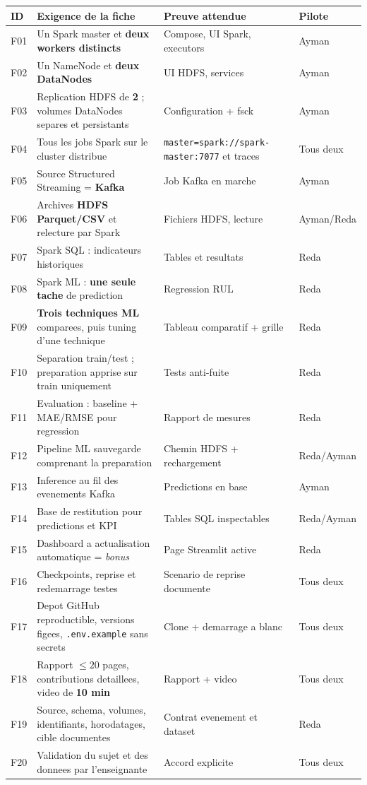 \documentclass[10pt,a4paper]{article}
\newcommand{\code}[1]{{\small\ttfamily\nolinkurl{#1}}}
\begin{document}
\begin{longtable}{@{}p{12mm}p{82mm}p{32mm}p{30mm}@{}}
\toprule
\textbf{ID} & \textbf{Exigence de la fiche} & \textbf{Preuve attendue} & \textbf{Pilote}\\\midrule
\endhead
F01 & Un Spark master et \textbf{deux workers distincts} & Compose, UI Spark, executors & Ayman\\
F02 & Un NameNode et \textbf{deux DataNodes} & UI HDFS, services & Ayman\\
F03 & Replication HDFS de \textbf{2} ; volumes DataNodes separes et persistants & Configuration + fsck & Ayman\\
F04 & Tous les jobs Spark sur le cluster distribue & \code{master=spark://spark-master:7077} et traces & Tous deux\\
F05 & Source Structured Streaming = \textbf{Kafka} & Job Kafka en marche & Ayman\\
F06 & Archives \textbf{HDFS Parquet/CSV} et relecture par Spark & Fichiers HDFS, lecture & Ayman/Reda\\
F07 & Spark SQL : indicateurs historiques & Tables et resultats & Reda\\
F08 & Spark ML : \textbf{une seule tache} de prediction & Regression RUL & Reda\\
F09 & \textbf{Trois techniques ML} comparees, puis tuning d'une technique & Tableau comparatif + grille & Reda\\
F10 & Separation train/test ; preparation apprise sur train uniquement & Tests anti-fuite & Reda\\
F11 & Evaluation : baseline + MAE/RMSE pour regression & Rapport de mesures & Reda\\
F12 & Pipeline ML sauvegarde comprenant la preparation & Chemin HDFS + rechargement & Reda/Ayman\\
F13 & Inference au fil des evenements Kafka & Predictions en base & Ayman\\
F14 & Base de restitution pour predictions et KPI & Tables SQL inspectables & Reda/Ayman\\
F15 & Dashboard a actualisation automatique = \emph{bonus} & Page Streamlit active & Reda\\
F16 & Checkpoints, reprise et redemarrage testes & Scenario de reprise documente & Tous deux\\
F17 & Depot GitHub reproductible, versions figees, \code{.env.example} sans secrets & Clone + demarrage a blanc & Tous deux\\
F18 & Rapport \(\leq 20\) pages, contributions detaillees, video de \textbf{10 min} & Rapport + video & Tous deux\\
F19 & Source, schema, volumes, identifiants, horodatages, cible documentes & Contrat evenement et dataset & Reda\\
F20 & Validation du sujet et des donnees par l'enseignante & Accord explicite & Tous deux\\
\bottomrule
\end{longtable}
\end{document}
